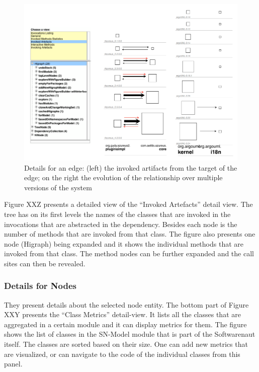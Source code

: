 \documentclass[preprint,12pt]{elsarticle}
\begin{document}
\begin{figure}[h]
\begin{center}
\includegraphics[width=0.85\linewidth]{images/DetailsForEdge}
\caption{Details for an edge: (left) the invoked artifacts from the target of the edge; on the right the evolution of the relationship over multiple versions of the system}
\label{}
\end{center}
\end{figure}
Figure XXZ presents a detailed view of the “Invoked Artefacts” detail view. The tree has on its first levels the names of the classes that are invoked in the invocations that are abstracted in the dependency. Besides each node is the number of methods that are invoked from that class. The figure also presents one node (Higraph) being expanded and it shows the individual methods that are invoked from that class. The method nodes can be further expanded and the call sites can then be revealed. 


\subsubsection {Details for Nodes}

They present details about the selected node entity. The bottom part of Figure XXY presents the “Class Metrics” detail-view. It lists all the classes that are aggregated in a certain module and it can display metrics for them. The figure shows the list of classes in the SN-Model module that is part of the Softwarenaut itself. The classes are sorted based on their size. One can add new metrics that are visualized, or can navigate to the code of the individual classes from this panel.
\end{document}
